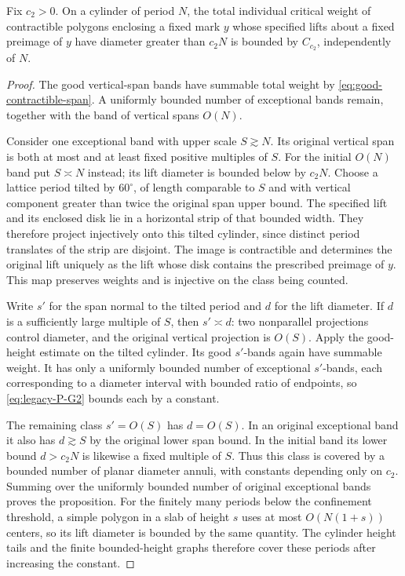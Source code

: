 \begin{auxproposition}
Fix $c_2>0$. On a cylinder of period $N$, the total individual critical weight of contractible polygons enclosing a fixed mark $y$ whose specified lifts about a fixed preimage of $y$ have diameter greater than $c_2N$ is bounded by $C_{c_2}$, independently of $N$.
\end{auxproposition}
\begin{proof}
The good vertical-span bands have summable total weight by \eqref{eq:good-contractible-span}. A uniformly bounded number of exceptional bands remain, together with the band of vertical spans $O(N)$.

Consider one exceptional band with upper scale $S\gtrsim N$. Its original vertical span is both at most and at least fixed positive multiples of $S$. For the initial $O(N)$ band put $S\asymp N$ instead; its lift diameter is bounded below by $c_2N$. Choose a lattice period tilted by $60^\circ$, of length comparable to $S$ and with vertical component greater than twice the original span upper bound. The specified lift and its enclosed disk lie in a horizontal strip of that bounded width. They therefore project injectively onto this tilted cylinder, since distinct period translates of the strip are disjoint. The image is contractible and determines the original lift uniquely as the lift whose disk contains the prescribed preimage of $y$. This map preserves weights and is injective on the class being counted.

Write $s'$ for the span normal to the tilted period and $d$ for the lift diameter. If $d$ is a sufficiently large multiple of $S$, then $s'\asymp d$: two nonparallel projections control diameter, and the original vertical projection is $O(S)$. Apply the good-height estimate on the tilted cylinder. Its good $s'$-bands again have summable weight. It has only a uniformly bounded number of exceptional $s'$-bands, each corresponding to a diameter interval with bounded ratio of endpoints, so \eqref{eq:legacy-P-G2} bounds each by a constant.

The remaining class $s'=O(S)$ has $d=O(S)$. In an original exceptional band it also has $d\gtrsim S$ by the original lower span bound. In the initial band its lower bound $d>c_2N$ is likewise a fixed multiple of $S$. Thus this class is covered by a bounded number of planar diameter annuli, with constants depending only on $c_2$. Summing over the uniformly bounded number of original exceptional bands proves the proposition. For the finitely many periods below the confinement threshold, a simple polygon in a slab of height $s$ uses at most $O(N(1+s))$ centers, so its lift diameter is bounded by the same quantity. The cylinder height tails and the finite bounded-height graphs therefore cover these periods after increasing the constant.
\end{proof}

